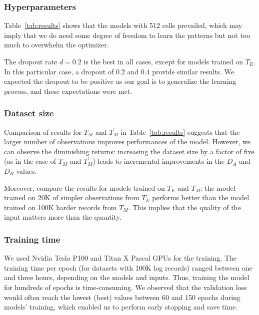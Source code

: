 \documentclass{article}
\begin{document}
\subsubsection{Hyperparameters}
Table~\ref{tab:results} shows that the models with 512 cells prevailed, which may imply that we do need some degree of freedom to learn the patterns but not too much to overwhelm the optimizer.

The dropout rate $d = 0.2$ is the best in all cases, except for models trained on $T_E$. In this particular case, a dropout of $0.2$ and $0.4$ provide similar results. We expected the dropout to be positive as our goal is to generalize the learning process, and these expectations were met. 


\subsubsection{Dataset size}
Comparison of results for $T_M$ and $T_M^\prime$ in Table~\ref{tab:results} suggests that the larger number of observations improves performances of the model. However,  we can observe the diminishing returns: increasing the dataset size by a factor of five (as in the case of $T_M$ and $T_M^\prime$) leads to incremental improvements in the $D_A$ and $D_R$ values. 

Moreover, compare the results for models trained on $T_E$ and $T_M$: the model trained on 20K of simpler observations from $T_E$ performs better than the model trained on 100K harder records from $T_M$. This implies that the quality of the input matters more than the quantity. 


\subsubsection{Training time}
We used Nvidia Tesla P100 and Titan X Pascal GPUs for the training. The training time per epoch (for datasets with 100K log records) ranged between one and three hours, depending on the models and inputs. Thus, training the model for hundreds of epochs is time-consuming. We observed that the validation loss would often reach the lowest (best) values between 60 and 150 epochs during models' training, which enabled us to perform early stopping and save time.
\end{document}
